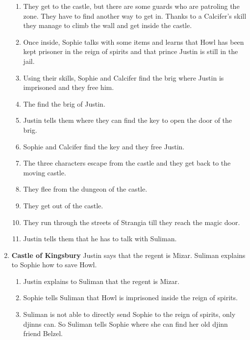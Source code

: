 \begin{enumerate}
\begin{enumerate}
  \item They get to the castle, but there are some guards who are patroling the zone. They have to find another way to get in. Thanks to a Calcifer’s skill they manage to climb the wall and get inside the castle.
    
  \item Once inside, Sophie talks with some items and learns that Howl has been kept prisoner in the reign of spirits and that prince Justin is still in the jail.
    
  \item Using their skills, Sophie and Calcifer find the brig where Justin is imprisoned and they free him.
    
  \item The find the brig of Justin.
    
  \item Justin tells them where they can find the key to open the door of the brig.
    
  \item Sophie and Calcifer find the key and they free Justin.
    
  \item The three characters escape from the castle and they get back to the moving castle.
    
  \item They flee from the dungeon of the castle.
    
  \item They get out of the castle.
    
  \item They run through the streets of Strangia till they reach the magic door.
    
  \item Justin tells them that he has to talk with Suliman.
  \end{enumerate}

\item \textbf{Castle of Kingsbury} Justin says that the regent is Mizar. Suliman explains to Sophie how to save Howl.

  \begin{enumerate}
  \item Justin explains to Suliman that the regent is Mizar.
    
  \item Sophie tells Suliman that Howl is imprisoned inside the reign of spirits.
    
  \item Suliman is not able to directly send Sophie to the reign of spirits, only djinns can. So Suliman tells Sophie where she can find her old djinn friend Belzel.
    

\end{enumerate}
\end{enumerate}
